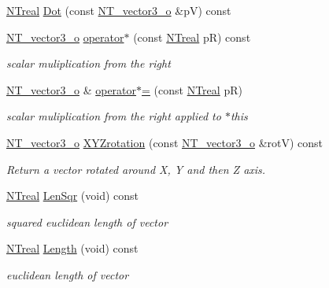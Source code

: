 \begin{DoxyCompactItemize}
\hyperlink{nt__types_8h_a814a97893e9deb1eedcc7604529ba80d}{NTreal} \hyperlink{class_n_t__vector3__o_a2d6e060711a6a5a3c4e1013d795e0c39}{Dot} (const \hyperlink{class_n_t__vector3__o}{NT\_\-vector3\_\-o} \&pV) const 
\item 
\hyperlink{class_n_t__vector3__o}{NT\_\-vector3\_\-o} \hyperlink{class_n_t__vector3__o_ae058074041b795988d6d79a171225ee0}{operator$\ast$} (const \hyperlink{nt__types_8h_a814a97893e9deb1eedcc7604529ba80d}{NTreal} pR) const 
\begin{DoxyCompactList}\small\item\em scalar muliplication from the right \item\end{DoxyCompactList}\item 
\hyperlink{class_n_t__vector3__o}{NT\_\-vector3\_\-o} \& \hyperlink{class_n_t__vector3__o_a90fc77aef08b9199db661c7331097943}{operator$\ast$=} (const \hyperlink{nt__types_8h_a814a97893e9deb1eedcc7604529ba80d}{NTreal} pR)
\begin{DoxyCompactList}\small\item\em scalar muliplication from the right applied to $\ast$this \item\end{DoxyCompactList}\item 
\hyperlink{class_n_t__vector3__o}{NT\_\-vector3\_\-o} \hyperlink{class_n_t__vector3__o_a63a525e6b7bcb4285c4eda1c228caf2a}{XYZrotation} (const \hyperlink{class_n_t__vector3__o}{NT\_\-vector3\_\-o} \&rotV) const 
\begin{DoxyCompactList}\small\item\em Return a vector rotated around X, Y and then Z axis. \item\end{DoxyCompactList}\item 
\hyperlink{nt__types_8h_a814a97893e9deb1eedcc7604529ba80d}{NTreal} \hyperlink{class_n_t__vector3__o_ae007ae94bc8c2f43fc0f5c0c69191a35}{LenSqr} (void) const 
\begin{DoxyCompactList}\small\item\em squared euclidean length of vector \item\end{DoxyCompactList}\item 
\hyperlink{nt__types_8h_a814a97893e9deb1eedcc7604529ba80d}{NTreal} \hyperlink{class_n_t__vector3__o_aebb5322daf3c5bd074576d30ed813245}{Length} (void) const 
\begin{DoxyCompactList}\small\item\em euclidean length of vector \item\end{DoxyCompactList}\item 

\end{DoxyCompactItemize}
